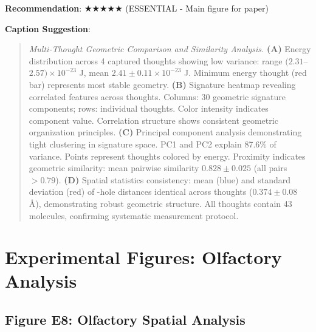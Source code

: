 \documentclass[11pt]{article}
\begin{document}
\textbf{Recommendation}: $\bigstar\bigstar\bigstar\bigstar\bigstar$ (ESSENTIAL - Main figure for paper)

\textbf{Caption Suggestion}:
\begin{quote}
\textit{Multi-Thought Geometric Comparison and Similarity Analysis.} \textbf{(A)} Energy distribution across 4 captured thoughts showing low variance: range $(2.31$--$2.57) \times 10^{-23}$ J, mean $2.41 \pm 0.11 \times 10^{-23}$ J. Minimum energy thought (red bar) represents most stable geometry. \textbf{(B)} Signature heatmap revealing correlated features across thoughts. Columns: 30 geometric signature components; rows: individual thoughts. Color intensity indicates component value. Correlation structure shows consistent geometric organization principles. \textbf{(C)} Principal component analysis demonstrating tight clustering in signature space. PC1 and PC2 explain 87.6\% of variance. Points represent thoughts colored by energy. Proximity indicates geometric similarity: mean pairwise similarity $0.828 \pm 0.025$ (all pairs $> 0.79$). \textbf{(D)} Spatial statistics consistency: mean (blue) and standard deviation (red) of -hole distances identical across thoughts ($0.374 \pm 0.08$ Å), demonstrating robust geometric structure. All thoughts contain 43  molecules, confirming systematic measurement protocol.
\end{quote}

\newpage

\section{Experimental Figures: Olfactory Analysis}

\subsection{Figure E8: Olfactory Spatial Analysis}

\end{document}
